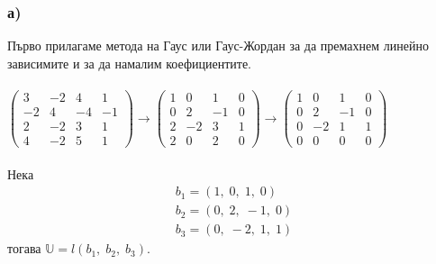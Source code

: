 \documentclass[a4paper, 12pt]{article}
\begin{document}
    \subsubsection*{а)}
    Първо прилагаме метода на Гаус или Гаус-Жордан за да премахнем линейно
    зависимите и за да намалим коефициентите. \\\\
    $\begin{pmatrix}
         3 &  -2 & 4 &  1\\
        -2 &  4 & -4 & -1\\
         2 & -2 &  3 &  1\\
         4 & -2 &  5 &  1
    \end{pmatrix} \to \begin{pmatrix}
         1 & 0 &  1 &  0\\
         0 & 2 & -1 &  0\\
         2 &-2 &  3 &  1\\
         2 & 0 &  2 &  0
    \end{pmatrix} \to \begin{pmatrix}
         1 & 0 &  1 & 0\\
         0 & 2 & -1 & 0\\
         0 &-2 &  1 & 1\\
         0 & 0 &  0 & 0
    \end{pmatrix}$ \\\\
    Нека \begin{align*}
        b_1 = (1, \; 0, \; 1, \; 0) \\
        b_2 = (0, \; 2, \; -1, \; 0) \\
        b_3 = (0, \; -2, \; 1, \; 1)
    \end{align*}
    тогава $\mathbb{U} = l(b_1, \; b_2, \; b_3)$. \\\\
    
\end{document}
